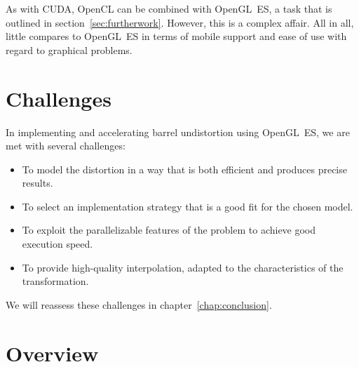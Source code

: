 \documentclass[english,12pt]{ifimaster}
\begin{document}

As with CUDA, OpenCL can be combined with OpenGL~ES, a task that is
outlined in section~\ref{sec:furtherwork}. However, this is a complex
affair. All in all, little compares to OpenGL~ES in terms of mobile
support and ease of use with regard to graphical problems.

\section{Challenges}
\label{sec:challenges}

In implementing and accelerating barrel undistortion using OpenGL~ES,
we are met with several challenges:
\begin{itemize}
\item To model the distortion in a way that is both efficient and
  produces precise results.
\item To select an implementation strategy that is a good fit for the
  chosen model.
\item To exploit the parallelizable features of the problem to achieve
  good execution speed.
\item To provide high-quality interpolation, adapted to the
  characteristics of the transformation.
\end{itemize}
We will reassess these challenges in chapter~\ref{chap:conclusion}.

\section{Overview}
\end{document}
